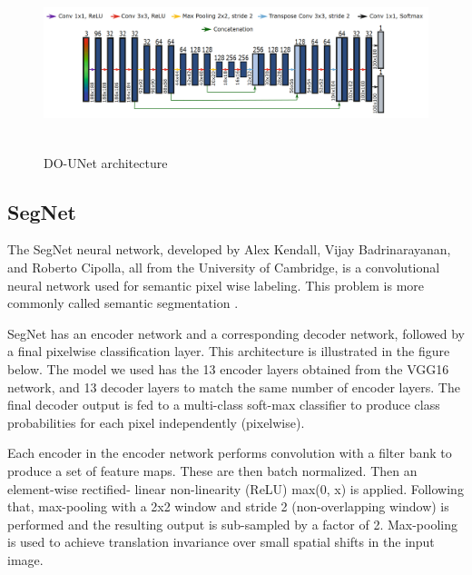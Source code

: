 \documentclass[conference]{IEEEtran}
\begin{document}
\begin{figure}
\centering
  \vspace{0.2in}
    \centerline{\includegraphics[width = \linewidth,height=2in]{images/DO-UNET.png}}
    \caption{DO-UNet architecture}
    \label{fig:DO-UNET}
\end{figure}

\subsection{SegNet}

The SegNet neural network, developed by Alex Kendall, Vijay Badrinarayanan, and Roberto Cipolla, all from the University of Cambridge, is a convolutional neural network used for semantic pixel wise labeling. This problem is more commonly called semantic segmentation \cite{badrinarayanan2017segnet}.

SegNet has an encoder network and a corresponding decoder network, followed by a final pixelwise classification layer. This architecture is illustrated in the figure below.
The model we used has the 13 encoder layers obtained from the VGG16 network, and 13 decoder layers to match the same number of encoder layers. The final decoder output is fed to a multi-class soft-max classifier to produce class probabilities for each pixel independently (pixelwise).

Each encoder in the encoder network performs convolution with a filter bank to produce a set of feature maps. These are then batch normalized. Then an element-wise rectified- linear non-linearity (ReLU) max(0, x) is applied. Following that, max-pooling with a 2x2 window and stride 2 (non-overlapping window) is performed and the resulting output is sub-sampled by a factor of 2. Max-pooling is used to achieve translation invariance over small spatial shifts in the input image.
\end{document}
